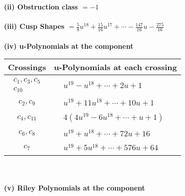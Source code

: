 \documentclass[1p]{elsarticle_modified}
\theoremstyle{definition}
\begin{document}
\flushleft \textbf{(ii) Obstruction class $= -1$}\\~\\
\flushleft \textbf{(iii) Cusp Shapes $= \frac{5}{8} u^{18}+\frac{15}{16} u^{17}+\cdots-\frac{147}{16} u-\frac{275}{16}$}\\~\\
\newpage\renewcommand{\arraystretch}{1}
\flushleft \textbf{(iv) u-Polynomials at the component}\newline \\
\begin{tabular}{m{50pt}|m{274pt}}
Crossings & \hspace{64pt}u-Polynomials at each crossing \\
\hline $$\begin{aligned}c_{1},c_{3},c_{5}\\c_{10}\end{aligned}$$&$\begin{aligned}
&u^{19}- u^{18}+\cdots+2 u+1
\end{aligned}$\\
\hline $$\begin{aligned}c_{2},c_{9}\end{aligned}$$&$\begin{aligned}
&u^{19}+11 u^{18}+\cdots+10 u+1
\end{aligned}$\\
\hline $$\begin{aligned}c_{4},c_{11}\end{aligned}$$&$\begin{aligned}
&4(4 u^{19}-6 u^{18}+\cdots+u+1)
\end{aligned}$\\
\hline $$\begin{aligned}c_{6},c_{8}\end{aligned}$$&$\begin{aligned}
&u^{19}+u^{18}+\cdots+72 u+16
\end{aligned}$\\
\hline $$\begin{aligned}c_{7}\end{aligned}$$&$\begin{aligned}
&u^{19}+5 u^{18}+\cdots+576 u+64
\end{aligned}$\\
\hline
\end{tabular}\\~\\
\newpage\renewcommand{\arraystretch}{1}
\flushleft \textbf{(v) Riley Polynomials at the component}\newline \\
\end{document}
